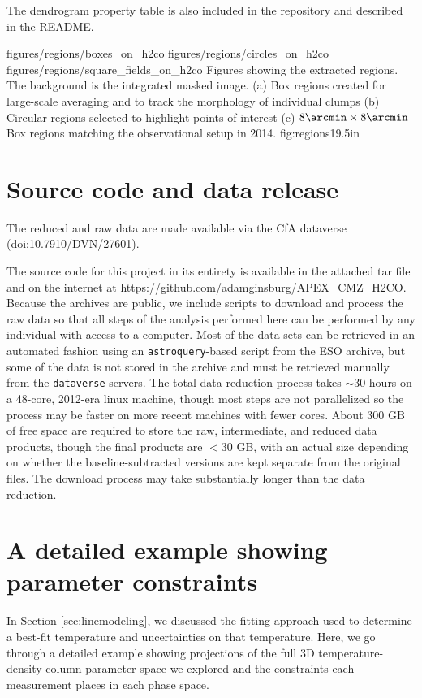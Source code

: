 The dendrogram property table is also included in the repository and described
in the README.

\RotFigureThreeAA
{figures/regions/boxes_on_h2co}
{figures/regions/circles_on_h2co}
{figures/regions/square_fields_on_h2co}
{Figures showing the extracted regions.  The background is the integrated
masked \para \threeohthree image. (a) Box regions created for large-scale averaging
and to track the morphology of individual clumps  (b) Circular regions selected
to highlight points of interest (c) $8\arcmin \times 8\arcmin$ Box regions
matching the observational setup in 2014.}
{fig:regions}{1}{9.5in}

\section{Source code and data release}
The reduced and raw data are made available via the CfA dataverse
(doi:10.7910/DVN/27601).

The source code for this project in its entirety is available in the attached
tar file and on the internet at
\url{https://github.com/adamginsburg/APEX_CMZ_H2CO}.
Because the archives are public, we include scripts to download and process the
raw data so that all steps of the analysis performed here can be performed by
any individual with access to a computer.  Most of the data sets can be retrieved
in an automated fashion using an \texttt{astroquery}-based script from the ESO archive,
but some of the data is not stored in the archive and must be retrieved manually from the
\texttt{dataverse} servers. The total data reduction process
takes $\sim30$ hours on a 48-core, 2012-era linux machine, though most steps
are not parallelized so the process may be faster on more recent machines with
fewer cores.  About 300 GB of free space are required to store the raw,
intermediate, and reduced data products, though the final products are $<30$
GB, with an actual size depending on whether the baseline-subtracted versions
are kept separate from the original files.  The download process may take
substantially longer than the data reduction.


\section{A detailed example showing parameter constraints}
In Section \ref{sec:linemodeling}, we discussed the fitting approach used
to determine a best-fit temperature and uncertainties on that temperature.
Here, we go through a detailed example showing projections of the full 3D
temperature-density-column parameter space we explored and the constraints
each measurement places in each phase space.

